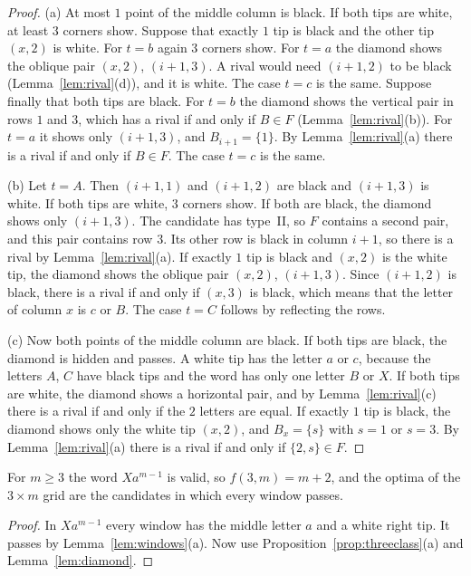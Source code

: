 \begin{proof}
(a) At most $1$ point of the middle column is black. If both tips are white, at
least $3$ corners show. Suppose that exactly $1$ tip is black and the other tip
$(x,2)$ is white. For $t=b$ again $3$ corners show. For $t=a$ the diamond shows
the oblique pair $(x,2)$, $(i+1,3)$. A rival would need $(i+1,2)$ to be black
(Lemma~\ref{lem:rival}(d)), and it is white. The case $t=c$ is the same.
Suppose finally that both tips are black. For $t=b$ the diamond shows the
vertical pair in rows $1$ and $3$, which has a rival if and only if $B\in F$
(Lemma~\ref{lem:rival}(b)). For $t=a$ it shows only $(i+1,3)$, and
$B_{i+1}=\{1\}$. By Lemma~\ref{lem:rival}(a) there is a rival if and only if
$B\in F$. The case $t=c$ is the same.

(b) Let $t=A$. Then $(i+1,1)$ and $(i+1,2)$ are black and $(i+1,3)$ is white. If
both tips are white, $3$ corners show. If both are black, the diamond shows only
$(i+1,3)$. The candidate has type~II, so $F$ contains a second pair, and this
pair contains row $3$. Its other row is black in column $i+1$, so there is a
rival by Lemma~\ref{lem:rival}(a). If exactly $1$ tip is black and $(x,2)$ is
the white tip, the diamond shows the oblique pair $(x,2)$, $(i+1,3)$. Since
$(i+1,2)$ is black, there is a rival if and only if $(x,3)$ is black, which
means that the letter of column $x$ is $c$ or $B$. The case $t=C$ follows by
reflecting the rows.

(c) Now both points of the middle column are black. If both tips are black, the
diamond is hidden and passes. A white tip has the letter $a$ or $c$, because the
letters $A$, $C$ have black tips and the word has only one letter $B$ or $X$.
If both tips are white, the diamond shows a horizontal pair, and by
Lemma~\ref{lem:rival}(c) there is a rival if and only if the $2$ letters are
equal. If exactly $1$ tip is black, the diamond shows only the white tip
$(x,2)$, and $B_x=\{s\}$ with $s=1$ or $s=3$. By Lemma~\ref{lem:rival}(a) there
is a rival if and only if $\{2,s\}\in F$.
\end{proof}

\begin{corollary}\label{cor:threevalue}
For $m\ge3$ the word $Xa^{m-1}$ is valid, so $f(3,m)=m+2$, and the optima of
the $3\times m$ grid are the candidates in which every window passes.
\end{corollary}

\begin{proof}
In $Xa^{m-1}$ every window has the middle letter $a$ and a white right tip.
It passes by Lemma~\ref{lem:windows}(a). Now use
Proposition~\ref{prop:threeclass}(a) and Lemma~\ref{lem:diamond}.
\end{proof}

